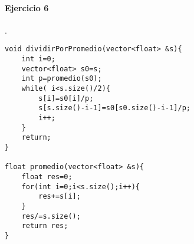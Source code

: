 \documentclass{article}
\begin{document}
\paragraph*{Ejercicio 6}.

\begin{lstlisting}
void dividirPorPromedio(vector<float> &s){
	int i=0;
	vector<float> s0=s;
	int p=promedio(s0);
	while( i<s.size()/2){
		s[i]=s0[i]/p;
		s[s.size()-i-1]=s0[s0.size()-i-1]/p;
		i++;
	}
	return;
}

float promedio(vector<float> &s){
	float res=0;
	for(int i=0;i<s.size();i++){
		res+=s[i];	
	}
	res/=s.size();
	return res;
}
\end{lstlisting}
\end{document}
